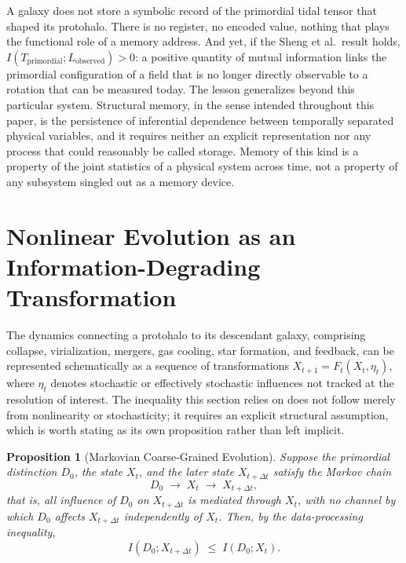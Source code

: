 \documentclass[11pt]{article}
\newtheorem{proposition}{Proposition}
\begin{document}
A galaxy does not store a symbolic record of the primordial tidal tensor that shaped its protohalo. There is no register, no encoded value, nothing that plays the functional role of a memory address. And yet, if the Sheng et al.\ result holds, $I(T_{\mathrm{primordial}}; L_{\mathrm{observed}}) > 0$: a positive quantity of mutual information links the primordial configuration of a field that is no longer directly observable to a rotation that can be measured today. The lesson generalizes beyond this particular system. Structural memory, in the sense intended throughout this paper, is the persistence of inferential dependence between temporally separated physical variables, and it requires neither an explicit representation nor any process that could reasonably be called storage. Memory of this kind is a property of the joint statistics of a physical system across time, not a property of any subsystem singled out as a memory device.

\section{Nonlinear Evolution as an Information-Degrading Transformation}

The dynamics connecting a protohalo to its descendant galaxy, comprising collapse, virialization, mergers, gas cooling, star formation, and feedback, can be represented schematically as a sequence of transformations $X_{t+1} = F_t(X_t, \eta_t)$, where $\eta_t$ denotes stochastic or effectively stochastic influences not tracked at the resolution of interest. The inequality this section relies on does not follow merely from nonlinearity or stochasticity; it requires an explicit structural assumption, which is worth stating as its own proposition rather than left implicit.

\begin{proposition}[Markovian Coarse-Grained Evolution]
Suppose the primordial distinction $D_0$, the state $X_t$, and the later state $X_{t+\Delta t}$ satisfy the Markov chain
\begin{equation}
D_0 \;\to\; X_t \;\to\; X_{t+\Delta t},
\end{equation}
that is, all influence of $D_0$ on $X_{t+\Delta t}$ is mediated through $X_t$, with no channel by which $D_0$ affects $X_{t+\Delta t}$ independently of $X_t$. Then, by the data-processing inequality,
\begin{equation}
I(D_0; X_{t+\Delta t}) \;\leq\; I(D_0; X_t).
\end{equation}
\end{proposition}
\end{document}
